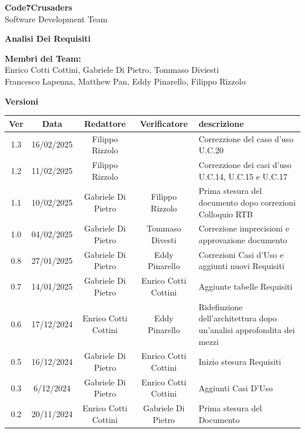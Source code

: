 \documentclass{article}
\begin{document}
\begin{titlepage}
    {\Huge \textbf{Code7Crusaders}}\\
    \vspace{0.5cm}
    {\Large Software Development Team}\\
    \vspace{2cm}
    
    \large \textbf{Analisi Dei Requisiti}
    \vspace{3.9cm}

    \textbf{Membri del Team:}\\
    Enrico Cotti Cottini, Gabriele Di Pietro, Tommaso Diviesti \\
    Francesco Lapenna, Matthew Pan, Eddy Pinarello, Filippo Rizzolo \\
    \vspace{0.5cm}
    
    \vspace{1cm}
\end{titlepage}



\newpage
\begin{center}
    \textbf{Versioni}
    \\
    \vspace{0.3cm}
    \begin{tabular}{|c|c|c|c|>{\centering\arraybackslash}m{}|}
        \hline
        \textbf{Ver} & \textbf{Data} & \textbf{Redattore} & \textbf{Verificatore} & \textbf{descrizione}\\
        \hline
        1.3 & 16/02/2025 & Filippo Rizzolo &  & Correzzione del caso d'uso U.C.20 \\
        1.2 & 11/02/2025 & Filippo Rizzolo &  & Correzzione dei casi d'uso U.C.14, U.C.15 e U.C.17 \\
        1.1 & 10/02/2025 & Gabriele Di Pietro & Filippo Rizzolo & Prima stesura del documento dopo correzioni Colloquio RTB \\
        1.0 & 04/02/2025 & Gabriele Di Pietro & Tommaso Divesti & Correzione imprecisioni e approvazione documento \\
        0.8 & 27/01/2025 & Gabriele Di Pietro & Eddy Pinarello & Correzioni Casi d'Uso e aggiunti nuovi Requisiti \\
        0.7 & 14/01/2025 & Gabriele Di Pietro & Enrico Cotti Cottini & Aggiunte tabelle Requisiti \\
        0.6 & 17/12/2024 & Enrico Cotti Cottini & Eddy Pinarello & Ridefinzione dell'architettura dopo un'analisi approfondita dei mezzi \\
        0.5 & 16/12/2024 & Gabriele Di Pietro & Enrico Cotti Cottini & Inizio stesura Requisiti \\
        0.3 & 6/12/2024 & Gabriele Di Pietro & Enrico Cotti Cottini & Aggiunti Casi D'Uso \\
        0.2 & 20/11/2024 & Enrico Cotti Cottini & Gabriele Di Pietro & Prima stesura del Documento \\
        \hline
    \end{tabular}
\end{center}
\end{document}
